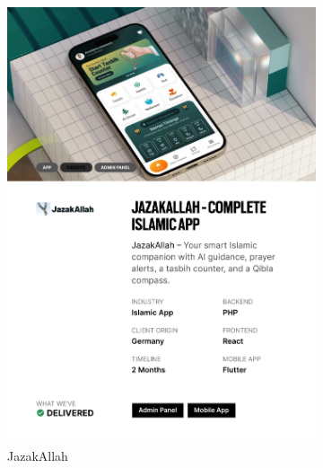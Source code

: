 \documentclass[12pt,a4paper]{report}
\begin{document}
\begin{figure}[h!]
\begin{subfigure}[b]{0.43\textwidth}
    \centering
    \includegraphics[width=\textwidth]{Figures/jazakallah.png}
    \caption{JazakAllah}
\end{subfigure}
\hfill
\begin{subfigure}[b]{0.43\textwidth}
    \centering

\end{subfigure}
\end{figure}
\end{document}
